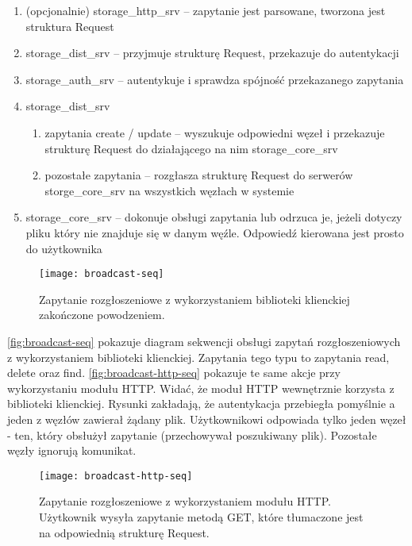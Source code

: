 \begin{enumerate}
	\item (opcjonalnie) storage\_http\_srv – zapytanie jest parsowane, tworzona jest struktura Request
	\item storage\_dist\_srv – przyjmuje strukturę Request, przekazuje do autentykacji
	\item storage\_auth\_srv – autentykuje i sprawdza spójność przekazanego zapytania
	\item storage\_dist\_srv
	\begin{enumerate}
		\item zapytania create / update – wyszukuje odpowiedni węzeł i przekazuje strukturę Request do działającego na nim storage\_core\_srv
		\item pozostałe zapytania – rozgłasza strukturę Request do serwerów storge\_core\_srv na wszystkich węzłach w systemie
	\end{enumerate}
	\item storage\_core\_srv – dokonuje obsługi zapytania lub odrzuca je, jeżeli dotyczy pliku który nie znajduje się w danym węźle. Odpowiedź kierowana jest prosto do użytkownika
\end{enumerate}

\begin{figure}[!htbp]
	\centering
	\texttt{[image: broadcast-seq]}
	\caption[Zapytanie rozgłoszeniowe (Erlang).]{Zapytanie rozgłoszeniowe z wykorzystaniem biblioteki klienckiej zakończone powodzeniem.}
	\label{fig:broadcast-seq}
\end{figure}

\autoref{fig:broadcast-seq} pokazuje diagram sekwencji obsługi zapytań rozgłoszeniowych z wykorzystaniem biblioteki klienckiej. Zapytania tego typu to zapytania read, delete oraz find. \autoref{fig:broadcast-http-seq} pokazuje te same akcje przy wykorzystaniu modułu HTTP. Widać, że moduł HTTP wewnętrznie korzysta z biblioteki klienckiej. Rysunki zakładają, że autentykacja przebiegła pomyślnie a jeden z węzłów zawierał żądany plik. Użytkownikowi odpowiada tylko jeden węzeł - ten, który obsłużył zapytanie (przechowywał poszukiwany plik). Pozostałe węzły ignorują komunikat.

\begin{figure}[!htbp]
	\centering
	\texttt{[image: broadcast-http-seq]}
	\caption[Zapytanie rozgłoszeniowe (HTTP).]{Zapytanie rozgłoszeniowe z wykorzystaniem modułu HTTP. Użytkownik wysyła zapytanie metodą GET, które tłumaczone jest na odpowiednią strukturę Request.}
	\label{fig:broadcast-http-seq}
\end{figure}

